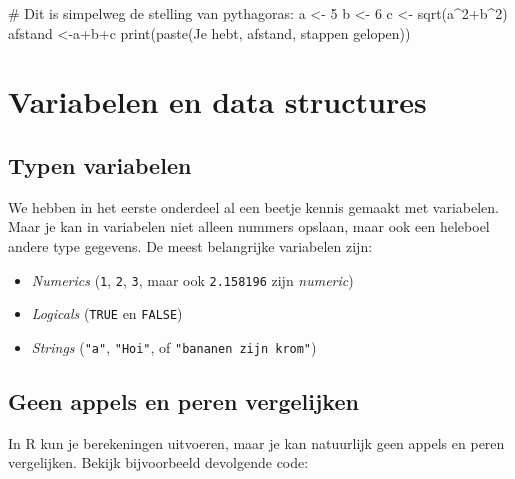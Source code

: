 \documentclass[
  b5paper,
  DIV=11,
  numbers=noendperiod]{scrreprt}
\newenvironment{Shaded}{\begin{snugshade}}{\end{snugshade}}
\newcommand{\CommentTok}[1]{\textcolor[rgb]{0.37,0.37,0.37}{#1}}
\newcommand{\DecValTok}[1]{\textcolor[rgb]{0.68,0.00,0.00}{#1}}
\newcommand{\FunctionTok}[1]{\textcolor[rgb]{0.28,0.35,0.67}{#1}}
\newcommand{\NormalTok}[1]{\textcolor[rgb]{0.00,0.23,0.31}{#1}}
\newcommand{\OtherTok}[1]{\textcolor[rgb]{0.00,0.23,0.31}{#1}}
\newcommand{\SpecialCharTok}[1]{\textcolor[rgb]{0.37,0.37,0.37}{#1}}
\newcommand{\StringTok}[1]{\textcolor[rgb]{0.13,0.47,0.30}{#1}}
\theoremstyle{definition}
\theoremstyle{remark}
\begin{document}
\begin{Shaded}
\begin{Highlighting}[]
\CommentTok{\# Dit is simpelweg de stelling van pythagoras:}
\NormalTok{a }\OtherTok{\textless{}{-}} \DecValTok{5}
\NormalTok{b }\OtherTok{\textless{}{-}} \DecValTok{6}
\NormalTok{c }\OtherTok{\textless{}{-}} \FunctionTok{sqrt}\NormalTok{(a}\SpecialCharTok{\^{}}\DecValTok{2}\SpecialCharTok{+}\NormalTok{b}\SpecialCharTok{\^{}}\DecValTok{2}\NormalTok{)}
\NormalTok{afstand }\OtherTok{\textless{}{-}}\NormalTok{a}\SpecialCharTok{+}\NormalTok{b}\SpecialCharTok{+}\NormalTok{c}
\FunctionTok{print}\NormalTok{(}\FunctionTok{paste}\NormalTok{(}\StringTok{\textquotesingle{}Je hebt\textquotesingle{}}\NormalTok{, afstand, }\StringTok{\textquotesingle{}stappen gelopen\textquotesingle{}}\NormalTok{))}
\end{Highlighting}
\end{Shaded}

\chapter{Variabelen en data
structures}\label{variabelen-en-data-structures}

\section{Typen variabelen}\label{typen-variabelen}

We hebben in het eerste onderdeel al een beetje kennis gemaakt met
variabelen. Maar je kan in variabelen niet alleen nummers opslaan, maar
ook een heleboel andere type gegevens. De meest belangrijke variabelen
zijn:

\begin{itemize}
\item
  \emph{Numerics} (\texttt{1}, \texttt{2}, \texttt{3}, maar ook
  \texttt{2.158196} zijn \emph{numeric})
\item
  \emph{Logicals} (\texttt{TRUE} en \texttt{FALSE})
\item
  \emph{Strings} (\texttt{"a"}, \texttt{"Hoi"}, of
  \texttt{"bananen\ zijn\ krom"})
\end{itemize}

\section{Geen appels en peren
vergelijken}\label{geen-appels-en-peren-vergelijken}

In R kun je berekeningen uitvoeren, maar je kan natuurlijk geen appels
en peren vergelijken. Bekijk bijvoorbeeld devolgende code:
\end{document}
